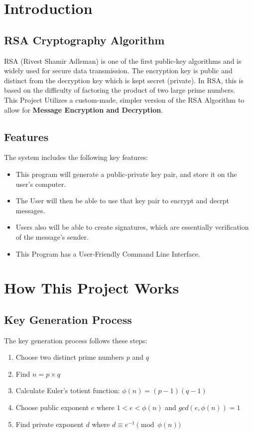 \documentclass[12pt,a4paper]{report}
\begin{document}
\chapter{Introduction}
\section{RSA Cryptography Algorithm}
RSA (Rivest Shamir Adleman) is one of the first public-key algorithms and is widely used for secure data transmission. The encryption key is public and distinct from the decryption key which is kept secret (private). In RSA, this is based on the difficulty of factoring the product of two large prime numbers.\\
This Project Utilizes a custom-made, simpler version of the RSA Algorithm to allow for \textbf{Message Encryption and Decryption}.

\section{Features}
The system includes the following key features:
\begin{itemize}
    \item This program will generate a public-private key pair, and store it on the user's computer.
    \item The User will then be able to use that key pair to encrypt and decrpt messages.
    \item Users also will be able to create signatures, which are essentially verification of the message's sender.
    \item This Program has a User-Friendly Command Line Interface.
\end{itemize}

\chapter{How This Project Works}

\section{Key Generation Process}
The key generation process follows these steps:
\begin{enumerate}
    \item Choose two distinct prime numbers $p$ and $q$
    \item Find $n = p \times q$
    \item Calculate Euler's totient function: $\phi(n) = (p-1)(q-1)$
    \item Choose public exponent $e$ where $1 < e < \phi(n)$ and $gcd(e, \phi(n)) = 1$
    \item Find private exponent $d$ where $d \equiv e^{-1} \pmod{\phi(n)}$
\end{enumerate}
\end{document}
